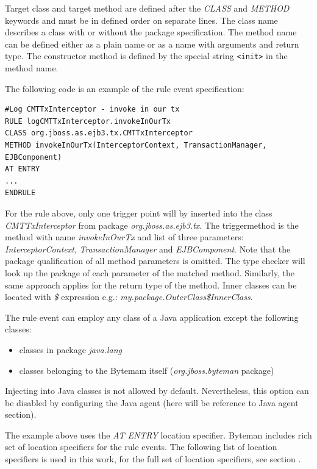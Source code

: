 \documentclass[12pt,oneside]{fithesis2}
\begin{document}
Target class and target method are defined after the \textit{CLASS} and \textit{METHOD} keywords and must be in defined order on separate lines. The class name describes a class with or without the package specification. The method name can be defined either as a plain name or as a name with arguments and return type. The constructor method is defined by the special string \verb|<init>| in the method name.

The following code is an example of the rule event specification:

\begin{lstlisting}[caption = Rule event specification, label = rule_event_code]
#Log CMTTxInterceptor - invoke in our tx
RULE logCMTTxInterceptor.invokeInOurTx
CLASS org.jboss.as.ejb3.tx.CMTTxInterceptor
METHOD invokeInOurTx(InterceptorContext, TransactionManager, EJBComponent)
AT ENTRY
...
ENDRULE
\end{lstlisting}

For the rule above, only one trigger point will by inserted into the class \textit{CMTTxInterceptor} from package \textit{org.jboss.as.ejb3.tx}. The triggermethod is the method with name \textit{invokeInOurTx} and list of three parameters: \textit{InterceptorContext}, \textit{TransactionManager} and \textit{EJBComponent}. Note that the package qualification of all method parameters is omitted. The type checker will look up the package of each parameter of the matched method. Similarly, the same approach applies for the return type of the method. Inner classes can be located with \textit{\$} expression e.g.: \textit{my.package.OuterClass\$InnerClass}.

The rule event can employ any class of a Java application except the following classes:

\begin{itemize}
   \item classes in package \textit{java.lang}
   \item classes belonging to the Bytemam itself (\textit{org.jboss.byteman} package)
\end{itemize}

Injecting into Java classes is not allowed by default. Nevertheless, this option can be disabled by configuring the Java agent (here will be reference to Java agent section).

The example above uses the \textit{AT ENTRY} location specifier. Byteman includes rich set of location specifiers for the rule events. The following list of location specifiers is used in this work, for the full set of location specifiers, see section \cite[Location Specifiers]{byteman_doc}.
\end{document}
